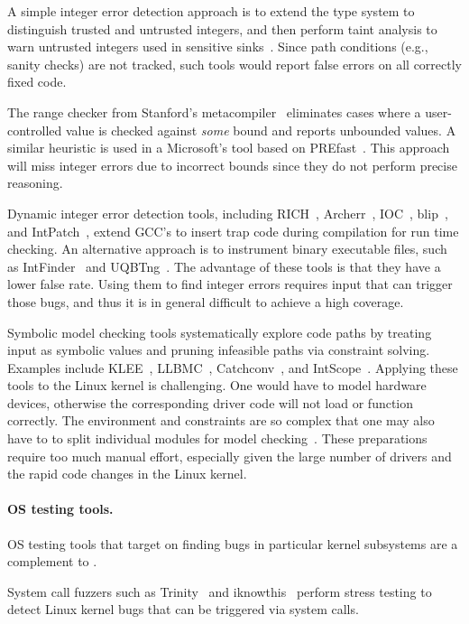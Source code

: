 A simple integer error detection approach is to extend the type
system to distinguish trusted and untrusted integers, and then
perform taint analysis to warn untrusted integers used in sensitive
sinks~\cite{cqual, lclint}.  Since path conditions (e.g., sanity
checks) are not tracked, such tools would report false errors on
all correctly fixed code.

The range checker from Stanford's metacompiler~\cite{range-checker}
eliminates cases where a user-controlled value is checked against
\emph{some} bound and reports unbounded values.  A similar heuristic
is used in a Microsoft's tool based on PREfast~\cite{prefast}.  This
approach will miss integer errors due to incorrect bounds since
they do not perform precise reasoning.

Dynamic integer error detection tools,
including
RICH~\cite{brumley:rich},
Archerr~\cite{archerr},
IOC~\cite{ioc},
blip~\cite{blip},
and
IntPatch~\cite{intpatch},
extend GCC's  to insert trap code during compilation for
run time checking.
%
An alternative approach is to instrument binary executable files,
such as IntFinder~\cite{intfinder} and UQBTng~\cite{uqbtng}.
%
The advantage of these tools is that they have a lower false rate.
Using them to find integer errors requires input that can trigger
those bugs, and thus it is in general difficult to achieve a high
coverage.

Symbolic model checking tools systematically explore code paths by
treating input as symbolic values and pruning infeasible paths via
constraint solving.  Examples include
KLEE~\cite{cadar:klee},
LLBMC~\cite{llbmc},
Catchconv~\cite{molnar:catchconv},
and
IntScope~\cite{intscope}.
Applying these tools to the Linux kernel is challenging.  One would
have to model hardware devices, otherwise the corresponding driver
code will not load or function correctly.  The environment and
constraints are so complex that one may also have to to split
individual modules for model checking~\cite{engler:vs}.  These
preparations require too much manual effort, especially given the
large number of drivers and the rapid code changes in the Linux
kernel.

\paragraph{OS testing tools.}
OS testing tools that target on finding bugs in particular kernel
subsystems are a complement to \sys.

System call fuzzers such as Trinity~\cite{trinity} and
iknowthis~\cite{iknowthis} perform stress testing to detect
Linux kernel bugs that can be triggered via system calls.

